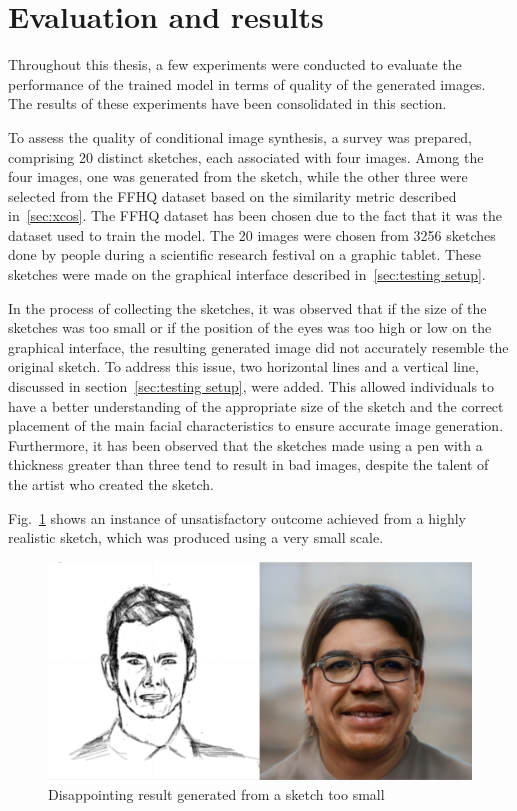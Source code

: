 \newpage
\section{Evaluation and results}
\label{sec:evaluation}
Throughout this thesis, a few experiments were conducted to evaluate the performance of the trained model in terms of quality of the generated images. The results of these experiments have been consolidated in this section.

\noindent To assess the quality of conditional image synthesis, a survey was prepared, comprising \num{20} distinct sketches, each associated with four images.
Among the four images, one was generated from the sketch, while the other three were selected from the FFHQ dataset based on the similarity metric described in~\ref{sec:xcos}.
The FFHQ dataset has been chosen due to the fact that it was the dataset used to train the model.
The \num{20} images were chosen from \num{3256} sketches done by people during a scientific research festival on a graphic tablet.
These sketches were made on the graphical interface described in~\ref{sec:testing setup}.

\noindent In the process of collecting the sketches, it was observed that if the size of the sketches was too small or if the position of the eyes was too high or low on the graphical interface, the resulting generated image did not accurately resemble the original sketch.
To address this issue, two horizontal lines and a vertical line, discussed in section~\ref{sec:testing setup}, were added.
This allowed individuals to have a better understanding of the appropriate size of the sketch and the correct placement of the main facial characteristics to ensure accurate image generation.
Furthermore, it has been observed that the sketches made using a pen with a thickness greater than three tend to result in bad images, despite the talent of the artist who created the sketch.

\noindent Fig.~\ref{fig:disappointing sketch small} shows an instance of unsatisfactory outcome achieved from a highly realistic sketch, which was produced using a very small scale.
\begin{figure}[htbp]
  \centering
  \includegraphics[scale=0.15]{figures/badResult1.png}
  \caption{Disappointing result generated from a sketch too small}
  \label{fig:disappointing sketch small}
\end{figure}

